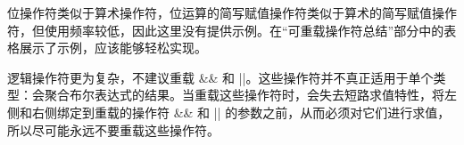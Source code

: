 位操作符类似于算术操作符，位运算的简写赋值操作符类似于算术的简写赋值操作符，但使用频率较低，因此这里没有提供示例。在“可重载操作符总结”部分中的表格展示了示例，应该能够轻松实现。

逻辑操作符更为复杂，不建议重载 \&\& 和 ||。这些操作符并不真正适用于单个类型：会聚合布尔表达式的结果。当重载这些操作符时，会失去短路求值特性，将左侧和右侧绑定到重载的操作符 \&\& 和 || 的参数之前，从而必须对它们进行求值，所以尽可能永远不要重载这些操作符。
